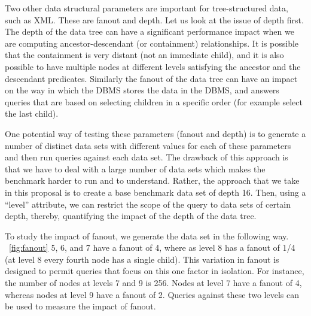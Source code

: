 Two other data structural parameters are important for tree-structured
data, such as XML. These are fanout and depth. Let us look at the
issue of depth first. The depth of the data tree can have a
significant performance impact when we are computing
ancestor-descendant (or containment) relationships.  It is possible
that the containment is very distant (not an immediate child), and it
is also possible to have multiple nodes at different levels satisfying
the ancestor and the descendant predicates.  Similarly the fanout of
the data tree can have an impact on the way in which the DBMS stores
the data in the DBMS, and answers queries that are based on selecting
children in a specific order (for example select the last child).

One potential way of testing these parameters (fanout and depth) is to
generate a number of distinct data sets with different values for each
of these parameters and then run queries against each data set. The
drawback of this approach is that we have to deal with a large number
of data sets which makes the benchmark harder to run and to
understand. Rather, the approach that we take in this proposal is to
create a base benchmark data set of depth 16. Then, using a ``level''
attribute, we can restrict the scope of the query to data sets of
certain depth, thereby, quantifying the impact of the depth of the
data tree.

To study the impact of fanout, we generate the data set in the
following way. ~\ref{fig:fanout}
 
  5, 6, and
7 have a fanout of 4, where as level 8 has a fanout of 1/4 (at level 8
every fourth node has a single child). This variation in fanout is
designed to permit queries that focus on this one factor in isolation.
For instance, the number of nodes at levels 7 and 9 is 256. Nodes at
level 7 have a fanout of 4, whereas  \new{} nodes at level 9 have a fanout
of 2. Queries against these two levels can be used to measure the
impact of fanout.

